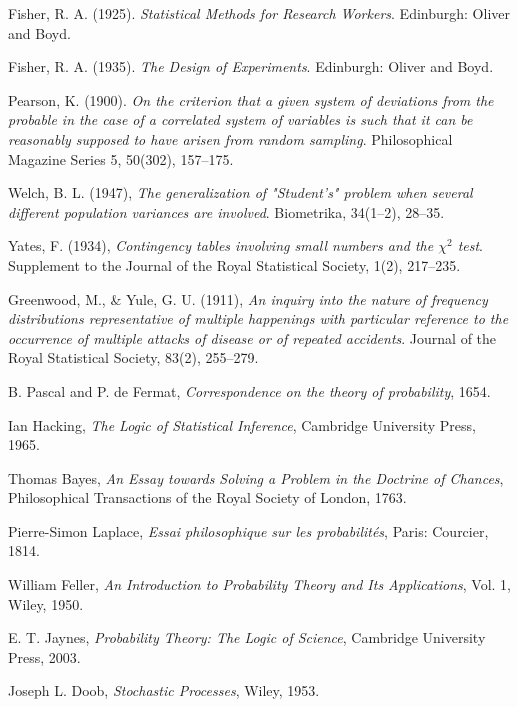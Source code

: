 \documentclass{book}
\begin{document}
\begin{thebibliography}{999}
Fisher, R. A. (1925). \textit{Statistical Methods for Research Workers}.
Edinburgh: Oliver and Boyd.

Fisher, R. A. (1935). \textit{The Design of Experiments}.
Edinburgh: Oliver and Boyd.

Pearson, K. (1900). 
\textit{On the criterion that a given system of deviations from the probable in the case of a correlated system of variables is such that it can be reasonably supposed to have arisen from random sampling}.
Philosophical Magazine Series 5, 50(302), 157–175.

Welch, B. L. (1947), 
\textit{The generalization of "Student’s" problem when several different population variances are involved}. 
Biometrika, 34(1–2), 28–35.

Yates, F. (1934), 
\textit{Contingency tables involving small numbers and the $\chi^2$ test}.
Supplement to the Journal of the Royal Statistical Society, 1(2), 217–235.

Greenwood, M., \& Yule, G. U. (1911), 
\textit{An inquiry into the nature of frequency distributions representative of multiple happenings with particular reference to the occurrence of multiple attacks of disease or of repeated accidents}.
Journal of the Royal Statistical Society, 83(2), 255–279.

B. Pascal and P. de Fermat, 
\textit{Correspondence on the theory of probability}, 1654.


Ian Hacking, 
\textit{The Logic of Statistical Inference}, 
Cambridge University Press, 1965.

Thomas Bayes, 
\textit{An Essay towards Solving a Problem in the Doctrine of Chances}, 
Philosophical Transactions of the Royal Society of London, 1763.

Pierre-Simon Laplace, 
\textit{Essai philosophique sur les probabilités}, 
Paris: Courcier, 1814.

William Feller, 
\textit{An Introduction to Probability Theory and Its Applications}, 
Vol. 1, Wiley, 1950.

E. T. Jaynes, 
\textit{Probability Theory: The Logic of Science}, 
Cambridge University Press, 2003.

Joseph L. Doob, 
\textit{Stochastic Processes}, 
Wiley, 1953.

\end{thebibliography}
\end{document}
